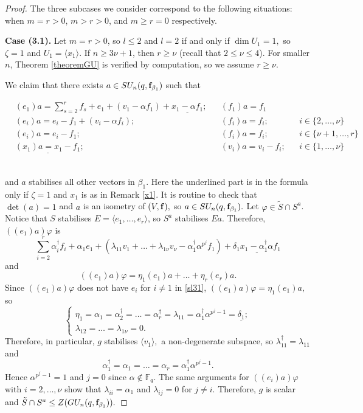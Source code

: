 \begin{proof}
\medskip


The three subcases we consider correspond to the following situations:
when  $m=r>0$,
  $m>r>0$,
and  $m \ge r=0$ respectively.


\medskip

{\bf Case (3.1).} Let $m=r>0$, so $l \le 2$ and $l=2$ if and only if $\dim U_1=1,$ so $\zeta=1$ and $U_1= \langle x_1 \rangle.$ If $n \ge 3 \nu+1$, then $r \ge \nu$ (recall that $2 \le \nu \le 4$). For smaller $n$, Theorem \ref{theoremGU} is verified by computation, so  we assume $r \ge \nu.$

We claim that there exists  $a \in SU_n(q, {\bf f}_{\beta_1})$ such that 
\begin{small}
\begin{equation*}%
\begin{aligned}
&(e_1)a =\sum_{s=2}^r f_s +e_1 +(v_1 -\alpha f_1)+ \underline{x_1 -\alpha f_1};& & (f_1)a=f_1 \\
&(e_{i})a = e_{i} - f_1 +(v_i - \alpha f_i); & &(f_{i})a=f_{i}; & &  i\in \{2, \ldots, \nu \}  \\
&(e_{i})a =e_{i} -f_1; & &(f_{i})a=f_{i}; && i\in \{\nu+1, \ldots, r \}   \\
&\underline{(x_1)a=x_1-f_1};&& (v_i)a= v_i-f_i;&& i\in \{1, \ldots, \nu \} 
\end{aligned}
\end{equation*}
\end{small}\\
and $a$ stabilises all other vectors in $\beta_1.$ Here the underlined part is in the formula only if ${\zeta}=1$ and $x_1$ is as in Remark \ref{x1}.  It is routine to check that $\det(a)=1$ and $a$ is an isometry of $(V, {\bf f}),$ so $a \in SU_n(q,{\bf f}_{\beta_1}).$ Let $\varphi \in \tilde{S} \cap S^a$.
 Notice that $S$ stabilises $E= \langle e_1, \ldots, e_r \rangle$, so $S^a$ stabilises  $Ea$. Therefore, $((e_1)a)\varphi$ is
\begin{equation}\label{sl31}
\sum_{i=2}^r\alpha_i^{\dagger} f_i  +\alpha_1 e_1 + (\lambda_{11} v_1 +\ldots + \lambda_{1 \nu} v_{\nu} -\alpha_1^{\dagger}\alpha^{p^j} f_1)+ \underline{\delta_1 x_1 -\alpha_1^{\dagger} \alpha f_1}
\end{equation}
and
$$((e_1)a)\varphi =\eta_1 (e_1)a + \ldots +\eta_r (e_r)a.$$
Since $((e_1)a)\varphi$ does not have $e_i$ for $i \ne 1$ in  \eqref{sl31}, 
$((e_1)a)\varphi=\eta_1(e_1)a,$ so 
$$
\begin{cases}
\eta_1=\alpha_1= \alpha_2^{\dagger}= \ldots = \alpha_r^{\dagger}=\lambda_{11}=\alpha_1^{\dagger}\alpha^{p^j-1}=\underline{\delta_1};\\
\lambda_{12}= \ldots = \lambda_{1 \nu}=0.
\end{cases}
$$ Therefore, in particular, $g$ stabilises $\langle v_1 \rangle,$ a non-degenerate subspace, so $\lambda_{11}^{\dagger}=\lambda_{11}$ and $$\alpha_1^{\dagger}=\alpha_1 = \ldots = \alpha_r=\alpha_1^{\dagger}\alpha^{p^j-1}.$$ Hence $\alpha^{p^j-1}=1$ and $j=0$ since $\alpha \notin \mathbb{F}_q.$ The same arguments for $((e_i)a)\varphi$ with $i=2, \ldots , \nu$ show that $\lambda_{ii}=\alpha_1$ and $\lambda_{ij}=0$ for $j \ne i.$ Therefore, $g$ is scalar and $\tilde{S} \cap S^a \le Z(GU_n(q,{\bf f}_{\beta_1})).$


\end{proof}
